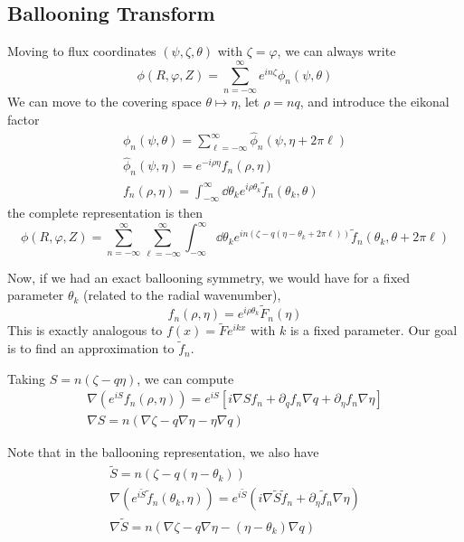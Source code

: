 \documentclass[]{article}
\begin{document}
\subsection{Ballooning Transform}

Moving to flux coordinates \((\psi, \zeta, \theta)\) with \(\zeta=\varphi\), we can always write
\begin{equation*}
	\phi(R,\varphi,Z) = \sum_{n=-\infty}^{\infty} e^{i n \zeta} \phi_n(\psi,\theta)
\end{equation*}
We can move to the covering space \(\theta \mapsto \eta\), let \(\rho = nq\), and introduce the eikonal factor
\begin{gather*}
	\phi_n(\psi, \theta) = \sum_{\ell=-\infty}^{\infty} \hat{\phi}_n(\psi, \eta + 2 \pi \ell) \\
	\hat{\phi}_n(\psi, \eta) = e^{-i\rho\eta} f_n(\rho,\eta) \\
	f_n(\rho, \eta) = \int_{-\infty}^{\infty} \dd{\theta_k} e^{i\rho\theta_k} \tilde{f}_n(\theta_k, \theta)
\end{gather*}
the complete representation is then
\begin{equation*}
	\phi(R,\varphi,Z) = \sum_{n=-\infty}^{\infty} \sum_{\ell = -\infty}^{\infty} \int_{-\infty}^{\infty} \dd{\theta}_k e^{in(\zeta - q(\eta - \theta_k + 2 \pi \ell))} \tilde{f}_n(\theta_k, \theta + 2 \pi \ell)
\end{equation*}

Now, if we had an exact ballooning symmetry, we would have for a fixed parameter \(\theta_k\) (related to the radial wavenumber),
\begin{equation*}
	f_n(\rho,\eta) = e^{i\rho\theta_k} \tilde{F}_n(\eta)
\end{equation*}
This is exactly analogous to \(f(x) = \tilde{F} e^{ikx}\) with \(k\) is a fixed parameter.
Our goal is to find an approximation to \(\tilde{f}_n\).

Taking \(S=n(\zeta - q \eta)\), we can compute
\begin{gather*}
	\nabla (e^{iS} f_n(\rho, \eta)) = e^{iS} \left[i\nabla S f_n + \partial_q f_n \nabla q + \partial_\eta f_n \nabla \eta\right] \\
	\nabla S = n(\nabla \zeta - q \nabla \eta - \eta \nabla q)
\end{gather*}

Note that in the ballooning representation, we also have
\begin{gather*}
	\tilde{S} = n(\zeta - q(\eta - \theta_k)) \\
	\nabla(e^{i\tilde{S}} \tilde{f}_n(\theta_k, \eta)) = e^{i\tilde{S}} (i\nabla \tilde{S} \tilde{f}_n + \partial_\eta \tilde{f}_n \nabla \eta) \\
	\nabla \tilde{S} = n(\nabla \zeta - q \nabla \eta - (\eta - \theta_k) \nabla q)
\end{gather*}
\end{document}
